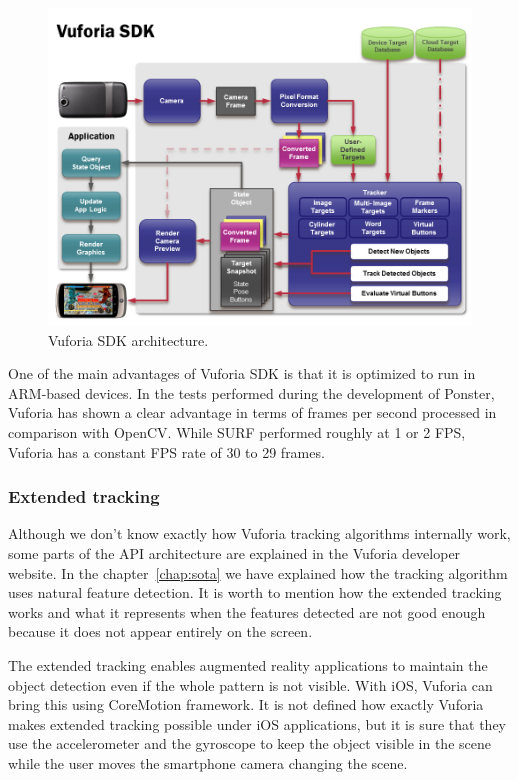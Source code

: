 \begin{figure}
\centering
\includegraphics[scale=0.45]{img/vuforiasdk.png}
\caption{\label{fig:vuforiasdk}Vuforia SDK architecture.}
\end{figure} 

One of the main advantages of Vuforia SDK is that it is optimized to run in
ARM-based devices. In the tests performed during the development of Ponster, Vuforia
has shown a clear advantage in terms of frames per second processed in comparison
with OpenCV. While SURF performed roughly at 1 or 2 FPS, Vuforia has a constant FPS
rate of 30 to 29 frames.

\subsubsection{Extended tracking}
Although we don't know exactly how Vuforia tracking algorithms internally work, some
parts of the API architecture are explained in the Vuforia developer website. In the
chapter~\ref{chap:sota} we have explained how the tracking algorithm uses natural
feature detection. It is worth to mention how the extended tracking works and what
it represents when the features detected are not good enough because it does not
appear entirely on the screen.

The extended tracking enables augmented reality applications to maintain the object
detection even if the whole pattern is not visible. With iOS, Vuforia can bring this
using CoreMotion framework. It is not defined how exactly Vuforia makes extended
tracking possible under iOS applications, but it is sure that they use the
accelerometer and the gyroscope to keep the object visible in the scene while the
user moves the smartphone camera changing the scene.


